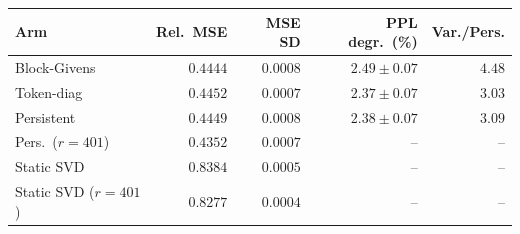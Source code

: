 \begin{tabular}{lrrrr}
\toprule
Arm & Rel.\ MSE & MSE SD & PPL degr.\ (\%) & Var./Pers. \\
\midrule
Block-Givens & $0.4444$ & $0.0008$ & $2.49 \pm 0.07$ & $4.48$ \\
Token-diag & $0.4452$ & $0.0007$ & $2.37 \pm 0.07$ & $3.03$ \\
Persistent & $0.4449$ & $0.0008$ & $2.38 \pm 0.07$ & $3.09$ \\
Pers.\ ($r{=}401$) & $0.4352$ & $0.0007$ & -- & -- \\
Static SVD & $0.8384$ & $0.0005$ & -- & -- \\
Static SVD ($r{=}401$) & $0.8277$ & $0.0004$ & -- & -- \\
\bottomrule
\end{tabular}
